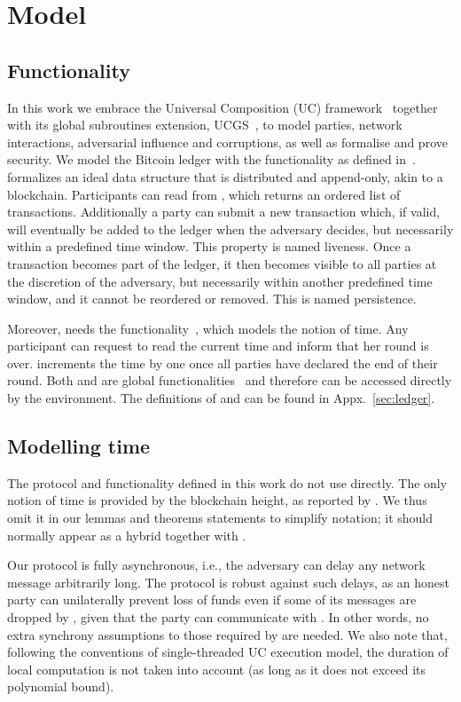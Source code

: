\section{Model}

  \subsection{\ledger Functionality}
  In this work we embrace the Universal Composition (UC) framework~\cite{uc}
  together with its global subroutines extension,
  UCGS~\cite{DBLP:conf/tcc/BadertscherCHTZ20}, to
  model parties, network interactions, adversarial influence and corruptions, as
  well as formalise and prove security. We model the Bitcoin ledger
  with the \ledger
  functionality as defined in~\cite{BMTZ17,genesis}. \ledger formalizes an ideal
  data structure that is
  distributed and append-only, akin to a blockchain. Participants can read from
  \ledger, which returns an ordered list of transactions. Additionally a party
  can submit a new transaction which, if valid, will eventually be added to the
  ledger when the adversary decides, but necessarily within a predefined time
  window. This property is named liveness. Once a transaction becomes part of
  the ledger, it then becomes visible to all parties at the discretion of the
  adversary, but necessarily within another predefined time window, and it
  cannot be reordered or removed. This is named persistence.

  Moreover, \ledger needs the \Fclock
  functionality~\cite{DBLP:conf/tcc/KatzMTZ13}, which models the notion of time.
  Any \Fclock participant can request to read the current time and inform \Fclock that her round is over. \Fclock increments the
  time by one once all parties have declared the end of their round. Both
  \ledger and \Fclock are global
  functionalities~\cite{DBLP:conf/tcc/BadertscherCHTZ20} and therefore can be
  accessed directly by the environment. The definitions of \ledger and \Fclock
  can be found in Appx.~\ref{sec:ledger}.

  \subsection{Modelling time}
  The protocol and functionality defined in this work do not use \Fclock
  directly. The only notion of time is provided by the
  blockchain height, as reported by \ledger. We thus omit it in
  our lemmas and theorems statements to simplify notation; it should
  normally appear as a hybrid together with \ledger.

  Our protocol is fully asynchronous, i.e., the adversary can delay any network
  message arbitrarily long. The protocol is robust against such delays, as an
  honest party can unilaterally prevent loss of funds even if some of its
  messages are dropped by \adversary, given that
  the party can communicate with \ledger. In other words, no
  extra synchrony assumptions to those required by \ledger are needed. We
  also note that,
  following the conventions of single-threaded UC execution model, the duration of local
  computation is not taken into account (as long as it does not
  exceed its polynomial bound).
